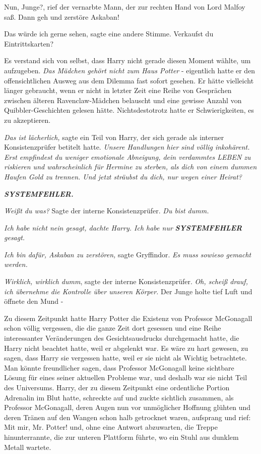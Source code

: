 \glqq{}Nun, Junge?\grqq{}, rief der vernarbte Mann, der zur rechten Hand von Lord
Malfoy saß. \glqq{}Dann geh und zerstöre Askaban!\grqq{}

\glqq{}Das würde ich gerne sehen\grqq{}, sagte eine andere Stimme. \glqq{}
Verkaufst du Eintrittskarten?\grqq{}

Es verstand sich von selbst, dass Harry nicht gerade diesen Moment wählte, um
aufzugeben. \emph{Das Mädchen gehört nicht zum Haus Potter} - eigentlich hatte
er den offensichtlichen Ausweg aus dem Dilemma fast sofort gesehen. Er hätte
vielleicht länger gebraucht, wenn er nicht in letzter Zeit eine Reihe von
Gesprächen zwischen älteren Ravenclaw-Mädchen belauscht und eine gewisse Anzahl
von Quibbler-Geschichten gelesen hätte. Nichtsdestotrotz hatte er
Schwierigkeiten, es zu akzeptieren.

\emph{Das ist lächerlich,} sagte ein Teil von Harry, der sich gerade als
interner Konsistenzprüfer betitelt hatte. \emph{Unsere Handlungen hier sind
völlig inkohärent. Erst empfindest du weniger emotionale Abneigung, dein
verdammtes LEBEN zu riskieren und wahrscheinlich für Hermine zu sterben, als
dich von einem dummen Haufen Gold zu trennen. Und jetzt sträubst du dich, nur
wegen einer Heirat?}

\textbf{\emph{SYSTEMFEHLER.} }

\emph{Weißt du was?} Sagte der interne Konsistenzprüfer. \emph{Du bist dumm.}

\emph{Ich habe nicht nein gesagt, dachte Harry. Ich habe nur
}\textbf{\emph{SYSTEMFEHLER}}\emph{ gesagt.}

\emph{Ich bin dafür, Askaban zu zerstören,} sagte Gryffindor. \emph{Es muss
sowieso gemacht werden.}

\emph{Wirklich, wirklich dumm}, sagte der interne Konsistenzprüfer. \emph{Oh,
scheiß drauf, ich übernehme die Kontrolle über unseren Körper.} Der Junge holte
tief Luft und öffnete den Mund -

Zu diesem Zeitpunkt hatte Harry Potter die Existenz von Professor McGonagall
schon völlig vergessen, die die ganze Zeit dort gesessen und eine Reihe
interessanter Veränderungen des Gesichtsausdrucks durchgemacht hatte, die Harry
nicht beachtet hatte, weil er abgelenkt war. Es wäre zu hart gewesen, zu sagen,
dass Harry sie vergessen hatte, weil er sie nicht als Wichtig betrachtete. Man
könnte freundlicher sagen, dass Professor McGonagall keine sichtbare Lösung für
eines seiner aktuellen Probleme war, und deshalb war sie nicht Teil des
Universums. Harry, der zu diesem Zeitpunkt eine ordentliche Portion Adrenalin im
Blut hatte, schreckte auf und zuckte sichtlich zusammen, als Professor
McGonagall, deren Augen nun vor unmöglicher Hoffnung glühten und deren Tränen
auf den Wangen schon halb getrocknet waren, aufsprang und rief: \glqq{}Mit mir,
Mr. Potter!\grqq{} und, ohne eine Antwort abzuwarten, die Treppe hinunterrannte,
die zur unteren Plattform führte, wo ein Stuhl aus dunklem Metall wartete.

